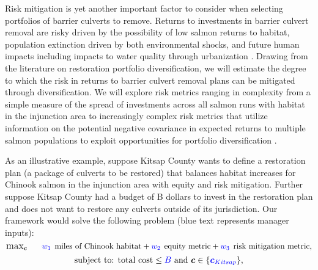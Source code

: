 \documentclass[12pt]{elsarticle}
\begin{document}
	Risk mitigation is yet another important factor to consider when selecting portfolios of barrier culverts to remove. Returns to investments in barrier culvert removal are risky driven by the possibility of low salmon returns to habitat, population extinction driven by both environmental shocks, and future human impacts including impacts to water quality through urbanization \citep{ettinger_prioritizing_2021}. Drawing from the literature on restoration portfolio diversification, we will estimate the degree to which the risk in returns to barrier culvert removal plans can be mitigated through diversification. We will explore risk metrics ranging in complexity from a simple measure of the spread of investments across all salmon runs with habitat in the injunction area to increasingly complex risk metrics that utilize information on the potential negative covariance in expected returns to multiple salmon populations to exploit opportunities for portfolio diversification \citep{sanchirico_empirical_2008, jardine_fishermen_2015, johnston_combining_2002}.  
	
	
	As an illustrative example, suppose Kitsap County wants to define a restoration plan (a package of culverts to be restored) that balances habitat increases for Chinook salmon in the injunction area with equity and risk mitigation. Further suppose Kitsap County had a budget of B dollars to invest in the restoration plan and does not want to restore any culverts outside of its jurisdiction. Our framework would solve the following problem (blue text represents manager inputs):
	\begin{equation*}
		\substack{\text{\large max}}_{\boldsymbol{c}}\hspace{0.25in} \textcolor{blue}{w_1}\:\: \text{miles of Chinook habitat} + \textcolor{blue}{w_2}\:\: \text{equity metric} + \textcolor{blue}{w_3}\:\: \text{risk mitigation metric},
	\end{equation*}
	\begin{equation*}
		\text{subject to:  total cost} \le \textcolor{blue}{B} \text{ and } \boldsymbol{c} \in \{\textcolor{blue}{\boldsymbol{c}_{Kitsap}}  \},
	\end{equation*}
	
\end{document}

